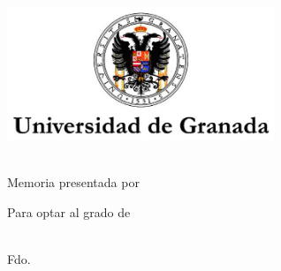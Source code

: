 \begin{titlepage}
    \begin{center}
        \large
        \vspace*{4cm}
        \includegraphics[width=8cm]{gfx/ugr_formal} \\

        \vspace{3cm}

        {\color{ugrOrange}\spacedallcaps{\myTitle}} \\ \bigskip
	{\textcolor{ugrGray} {\small Memoria presentada por}} \\ \bigskip
        \spacedlowsmallcaps{\myName}

        \vspace{2cm}
{\textcolor{ugrGray}
        {\small Para optar al grado de}\normalsize\\
        \large\spacedlowsmallcaps{\myDegree} \\ 

        \vspace{3.5cm}

        {\small Fdo. \myName }\\ \bigskip
	\myTime
}

    \end{center}
\end{titlepage}   